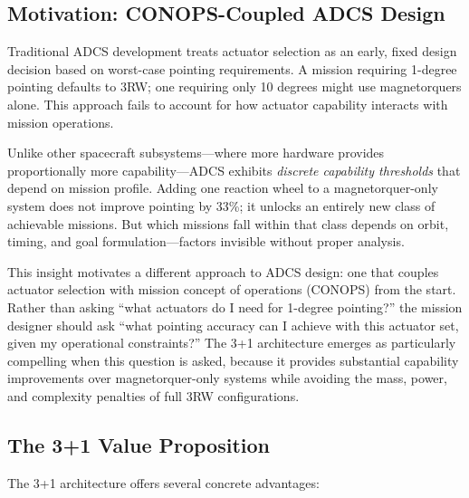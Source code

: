\documentclass[9pt]{extarticle}
\begin{document}
\subsection{Motivation: CONOPS-Coupled ADCS Design}

Traditional ADCS development treats actuator selection as an early, fixed design decision based on worst-case pointing requirements. A mission requiring 1-degree pointing defaults to 3RW; one requiring only 10 degrees might use magnetorquers alone. This approach fails to account for how actuator capability interacts with mission operations.

Unlike other spacecraft subsystems---where more hardware provides proportionally more capability---ADCS exhibits \emph{discrete capability thresholds} that depend on mission profile. Adding one reaction wheel to a magnetorquer-only system does not improve pointing by 33\%; it unlocks an entirely new class of achievable missions. But which missions fall within that class depends on orbit, timing, and goal formulation---factors invisible without proper analysis.

This insight motivates a different approach to ADCS design: one that couples actuator selection with mission concept of operations (CONOPS) from the start. Rather than asking ``what actuators do I need for 1-degree pointing?'' the mission designer should ask ``what pointing accuracy can I achieve with this actuator set, given my operational constraints?'' The 3+1 architecture emerges as particularly compelling when this question is asked, because it provides substantial capability improvements over magnetorquer-only systems while avoiding the mass, power, and complexity penalties of full 3RW configurations.

\subsection{The 3+1 Value Proposition}

The 3+1 architecture offers several concrete advantages:
\end{document}
